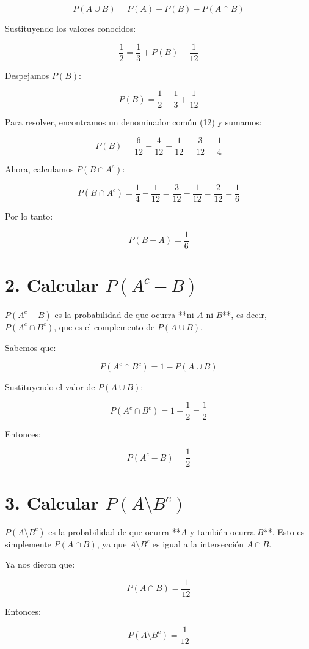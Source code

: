 \documentclass[titlepage]{article} %
\begin{document}
\[
P(A \cup B) = P(A) + P(B) - P(A \cap B)
\]

Sustituyendo los valores conocidos:

\[
\frac{1}{2} = \frac{1}{3} + P(B) - \frac{1}{12}
\]

Despejamos \( P(B) \):

\[
P(B) = \frac{1}{2} - \frac{1}{3} + \frac{1}{12}
\]

Para resolver, encontramos un denominador común (12) y sumamos:

\[
P(B) = \frac{6}{12} - \frac{4}{12} + \frac{1}{12} = \frac{3}{12} = \frac{1}{4}
\]

Ahora, calculamos \( P(B \cap A^c) \):

\[
P(B \cap A^c) = \frac{1}{4} - \frac{1}{12} = \frac{3}{12} - \frac{1}{12} = \frac{2}{12} = \frac{1}{6}
\]

Por lo tanto:

\[
P(B - A) = \frac{1}{6}
\]

\section*{2. Calcular \( P(A^c - B) \)}

\( P(A^c - B) \) es la probabilidad de que ocurra **ni \( A \) ni \( B \)**, es decir, \( P(A^c \cap B^c) \), que es el complemento de \( P(A \cup B) \).

Sabemos que:

\[
P(A^c \cap B^c) = 1 - P(A \cup B)
\]

Sustituyendo el valor de \( P(A \cup B) \):

\[
P(A^c \cap B^c) = 1 - \frac{1}{2} = \frac{1}{2}
\]

Entonces:

\[
P(A^c - B) = \frac{1}{2}
\]

\section*{3. Calcular \( P(A \setminus B^c) \)}

\( P(A \setminus B^c) \) es la probabilidad de que ocurra **\( A \) y también ocurra \( B \)**. Esto es simplemente \( P(A \cap B) \), ya que \( A \setminus B^c \) es igual a la intersección \( A \cap B \).

Ya nos dieron que:

\[
P(A \cap B) = \frac{1}{12}
\]

Entonces:

\[
P(A \setminus B^c) = \frac{1}{12}
\]
\end{document}
